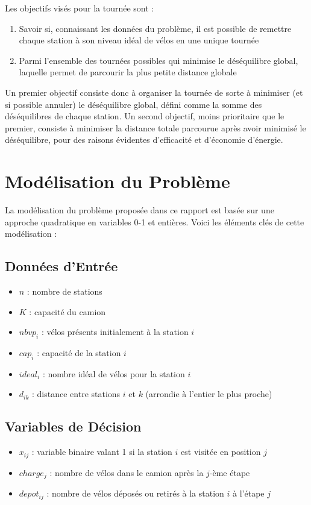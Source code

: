 \documentclass{article}
\begin{document}
Les objectifs visés pour la tournée sont :
\begin{enumerate}
    \item Savoir si, connaissant les données du problème, il est possible de remettre chaque station à son niveau idéal de vélos en une unique tournée
    \item Parmi l’ensemble des tournées possibles qui minimise le déséquilibre global, laquelle permet de parcourir la plus petite distance globale
\end{enumerate}
Un premier objectif consiste donc à organiser la tournée de sorte à minimiser (et si possible annuler) le déséquilibre global, défini comme la somme des déséquilibres de chaque station. Un second objectif, moins prioritaire que le premier, consiste à minimiser la distance totale parcourue après avoir minimisé le déséquilibre, pour des raisons évidentes d’efficacité et d’économie d’énergie.
\section{Modélisation du Problème}
La modélisation du problème proposée dans ce rapport est basée sur une approche quadratique en variables 0-1 et entières. Voici les éléments clés de cette modélisation :

\subsection{Données d'Entrée}
\begin{itemize}
    \item $n$ : nombre de stations
    \item $K$ : capacité du camion
    \item $nbvp_i$ : vélos présents initialement à la station $i$
    \item $cap_i$ : capacité de la station $i$
    \item $ideal_i$ : nombre idéal de vélos pour la station $i$
    \item $d_{ik}$ : distance entre stations $i$ et $k$ (arrondie à l'entier le plus proche)
\end{itemize}

\subsection{Variables de Décision}
\begin{itemize}
    \item $x_{ij}$ : variable binaire valant 1 si la station $i$ est visitée en position $j$
    \item $charge_j$ : nombre de vélos dans le camion après la $j$-ème étape
    \item $depot_{ij}$ : nombre de vélos déposés ou retirés à la station $i$ à l'étape $j$
\end{itemize}
\end{document}
